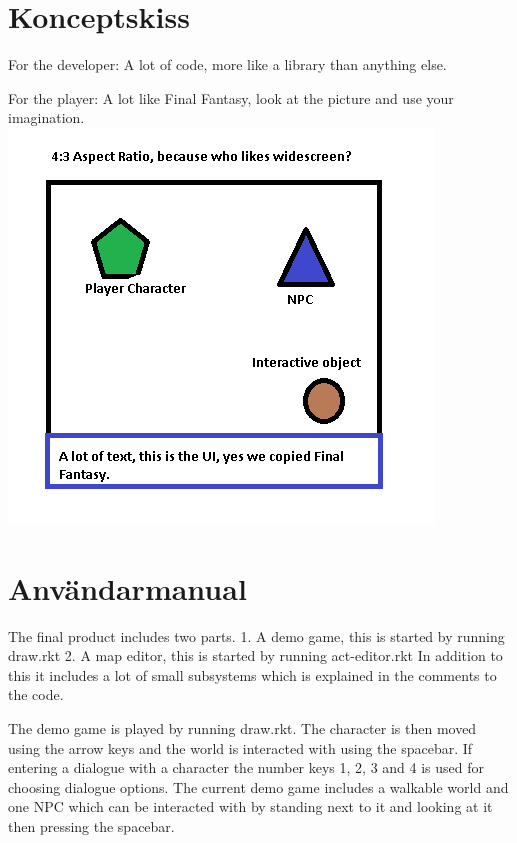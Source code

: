 \documentclass[12pt,a4paper]{article}
\begin{document}
\section{Konceptskiss}

For the developer: A lot of code, more like a library than anything else.

For the player: A lot like Final Fantasy, look at the picture and use your imagination.
\includegraphics{Koncept_sketch}




\section{Användarmanual}

The final product includes two parts.
1. A demo game, this is started by running draw.rkt
2. A map editor, this is started by running act-editor.rkt
In addition to this it includes a lot of small subsystems which is explained in the comments to the code.

The demo game is played by running draw.rkt. The character is then moved using the arrow keys and the world is interacted with using the spacebar.
If entering a dialogue with a character the number keys 1, 2, 3 and 4 is used for choosing dialogue options.
The current demo game includes a walkable world and one NPC which can be interacted with by standing next to it and looking at it then pressing the spacebar.
\end{document}
